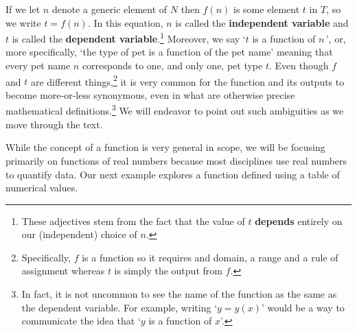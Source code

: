 \documentclass{ximera}
\begin{document}
If we let $n$ denote a generic element of $N$ then $f(n)$ is some element $t$ in $T$, so we write $t = f(n)$.  In this equation, $n$ is called the \textbf{independent variable} and $t$ is called the  \textbf{dependent variable}.\footnote{These adjectives stem from the fact that the value of $t$ \textbf{depends} entirely on our (independent) choice of $n$.}    Moreover, we say `$t$ is a function of $n\,$',  or, more specifically, `the type of pet is a function of the pet name'  meaning that every pet name $n$ corresponds to one, and only one, pet type $t$.   Even though $f$ and $t$ are different things,\footnote{Specifically, $f$ is a function so it requires and domain, a range and a rule of assignment whereas $t$ is simply the output from $f$.} it is very common for the  function and its outputs to become more-or-less synonymous, even in what are otherwise precise mathematical definitions.\footnote{In fact, it is not uncommon to see the name of the function as the same as the dependent variable. For example, writing `$y = y(x)$'  would be a way to communicate the idea that `$y$ is a function of $x$'.}  We will endeavor to point out such ambiguities as we move through the text.

\medskip

While the concept of a function is very general in scope, we will be focusing primarily on functions of real numbers because most disciplines use real numbers to quantify data.  Our next example explores a function defined using a table of numerical values.
\end{document}

